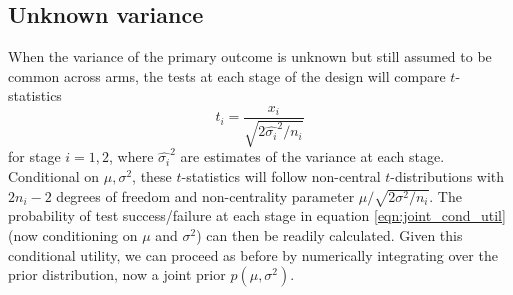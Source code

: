 \documentclass[sagev, Crown]{sagej} %
\begin{document}
\subsection{Unknown variance}

When the variance of the primary outcome is unknown but still assumed to be common across arms, the tests at each stage of the design will compare $t$-statistics
$$
t_i = \frac{x_i}{\sqrt{2\hat{\sigma_i}^2 / n_i}}
$$
for stage $i = 1,2$, where $\hat{\sigma_i}^2$ are estimates of the variance at each stage. Conditional on $\mu, \sigma^2$, these $t$-statistics will follow non-central $t$-distributions with $2n_i - 2$ degrees of freedom and non-centrality parameter $\mu/\sqrt{2\sigma^2 / n_i}$. The probability of test success/failure at each stage in equation \ref{eqn:joint_cond_util} (now conditioning on $\mu$ and $\sigma^2$) can then be readily calculated. Given this conditional utility, we can proceed as before by numerically integrating over the prior distribution, now a joint prior $p(\mu, \sigma^2)$.



\end{document}
